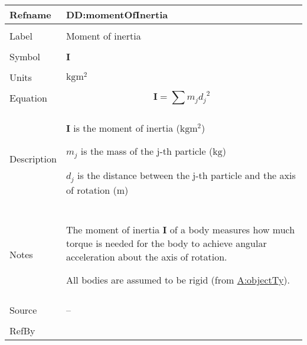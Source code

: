 \documentclass[12pt]{article}
\begin{document}
\begin{minipage}{\textwidth}
\begin{tabular}{>{\raggedright}p{}>{\raggedright\arraybackslash}p{}}
\toprule \textbf{Refname} & \textbf{DD:momentOfInertia}
\label{DD:momentOfInertia}
\\ \midrule \\
Label & Moment of inertia
        
\\ \midrule \\
Symbol & $\symbf{I}$
         
\\ \midrule \\
Units & $\text{kg}\text{m}^{2}$
        
\\ \midrule \\
Equation & \begin{displaymath}
           \symbf{I}=\displaystyle\sum{{m_{j}} {d_{j}}^{2}}
           \end{displaymath}
\\ \midrule \\
Description & \begin{symbDescription}
              \item{$\symbf{I}$ is the moment of inertia ($\text{kg}\text{m}^{2}$)}
              \item{${m_{j}}$ is the mass of the j-th particle (${\text{kg}}$)}
              \item{${d_{j}}$ is the distance between the j-th particle and the axis of rotation (${\text{m}}$)}
              \end{symbDescription}
\\ \midrule \\
Notes & The moment of inertia $\symbf{I}$ of a body measures how much torque is needed for the body to achieve angular acceleration about the axis of rotation.
        
        All bodies are assumed to be rigid (from \hyperref[assumpOT]{A:objectTy}).
        
\\ \midrule \\
Source & --
         
\\ \midrule \\
RefBy & 
\\ \bottomrule
\end{tabular}
\end{minipage}
\end{document}
